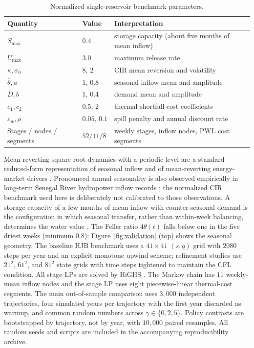 \documentclass[pdflatex,sn-mathphys-num]{sn-jnl}
\theoremstyle{thmstyleone}
\theoremstyle{thmstyletwo}
\theoremstyle{thmstylethree}
\begin{document}
\begin{table}[t]
\centering
\caption{Normalized single-reservoir benchmark parameters.}
\label{tab:params}
\begin{tabular}{lll}
\toprule
Quantity & Value & Interpretation\\
\midrule
$S_{\max}$ & $0.4$ & storage capacity (about five months of mean inflow)\\
$U_{\max}$ & $3.0$ & maximum release rate\\
$\kappa,\sigma_0$ & $8,\,2$ & CIR mean reversion and volatility\\
$\bar\theta,a$ & $1,\,0.8$ & seasonal inflow mean and amplitude\\
$\bar D,b$ & $1,\,0.4$ & demand mean and amplitude\\
$c_1,c_2$ & $0.5,\,2$ & thermal shortfall-cost coefficients\\
$\varepsilon_w,\rho$ & $0.05,\,0.1$ & spill penalty and annual discount rate\\
Stages / nodes / segments & $52/11/8$ & weekly stages, inflow nodes, PWL cost segments\\
\bottomrule
\end{tabular}
\end{table} Mean-reverting square-root dynamics with a periodic level are a
standard reduced-form representation of seasonal inflow and of
mean-reverting energy-market drivers \citep{cir1985,schwartz1997}. Pronounced
annual seasonality is also observed empirically in long-term Senegal River
hydropower inflow records \citep{affognon2026wavelet}; the normalized CIR
benchmark used here is deliberately not calibrated to those observations. A
storage capacity of a few months of mean inflow with counter-seasonal
demand is the configuration in which seasonal transfer, rather than
within-week balancing, determines the water value
\citep{gjelsvik1992,loucks2017}. The Feller ratio $4\theta(t)$ falls below
one in the five driest weeks (minimum $0.8$); Figure~\ref{fig:validation} (top) shows the
seasonal geometry. The baseline HJB benchmark uses a $41\times41$ $(s,q)$ grid with $2080$
steps per year and an explicit monotone upwind scheme; refinement studies use
$21^2$, $61^2$, and $81^2$ state grids with time steps tightened to maintain
the CFL condition. All stage LPs are solved by HiGHS \citep{huangfu2018}.
The Markov chain has $11$ weekly-mean inflow nodes and the stage LP uses eight
piecewise-linear thermal-cost segments. The main out-of-sample comparison uses
$3{,}000$ independent trajectories, four simulated years per trajectory with
the first year discarded as warmup, and common random numbers across
$\gamma\in\{0,2,5\}$. Policy contrasts are bootstrapped by trajectory, not by
year, with $10{,}000$ paired resamples. All random seeds and scripts are
included in the accompanying reproducibility archive.
\end{document}
